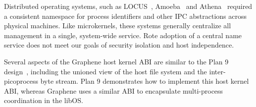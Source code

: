 Distributed operating systems, such as LOCUS~\citep{locus83sosp,fleisch86locus}, Amoeba~\citep{mullender90amoeba,cheriton89naming} and  
Athena~\citep{champine90athena} required a consistent namespace for process identifiers and other IPC abstractions
across physical machines.
Like microkernels, these systems generally centralize all management in a single, system-wide service.
Rote adoption of a central name service does not meet our goals
of security isolation and host independence.

Several aspects of the Graphene host kernel ABI are similar to the
Plan 9 design~\citep{pike90plan9}, including the unioned view of the host file system
and the inter-picoprocess byte stream.
Plan 9 demonstrates how to implement this host kernel ABI,
whereas Graphene uses a similar ABI 
to encapsulate multi-process coordination 
in the libOS.





